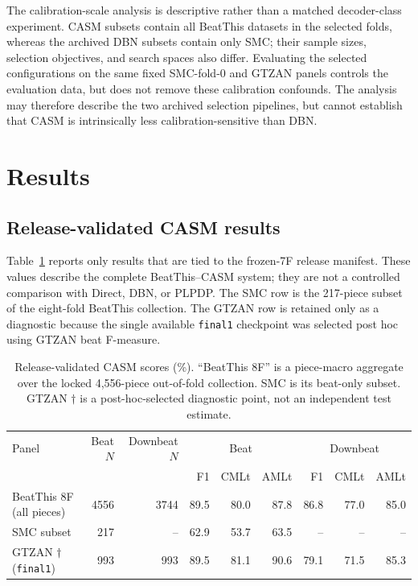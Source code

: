 \documentclass{article}
\begin{document}
The calibration-scale analysis is descriptive rather than a matched decoder-class experiment. CASM subsets contain all BeatThis datasets in the selected folds, whereas the archived DBN subsets contain only SMC; their sample sizes, selection objectives, and search spaces also differ. Evaluating the selected configurations on the same fixed SMC-fold-0 and GTZAN panels controls the evaluation data, but does not remove these calibration confounds. The analysis may therefore describe the two archived selection pipelines, but cannot establish that CASM is intrinsically less calibration-sensitive than DBN.


\section{Results}
\label{sec:results}

\subsection{Release-validated CASM results}
Table~\ref{tab:validated-release-results} reports only results that are tied to the frozen-7F release manifest. These values describe the complete BeatThis--CASM system; they are not a controlled comparison with Direct, DBN, or PLPDP. The SMC row is the 217-piece subset of the eight-fold BeatThis collection. The GTZAN row is retained only as a diagnostic because the single available \texttt{final1} checkpoint was selected post hoc using GTZAN beat F-measure.

\begin{table}[t]
\centering
\caption{Release-validated CASM scores (\%). ``BeatThis 8F'' is a piece-macro aggregate over the locked 4,556-piece out-of-fold collection. SMC is its beat-only subset. GTZAN $\dagger$ is a post-hoc-selected diagnostic point, not an independent test estimate.}
\label{tab:validated-release-results}
\begingroup
\fontsize{8.5pt}{9.5pt}\selectfont
\setlength{\tabcolsep}{4.2pt}
\begin{tabular}{lrr|rrr|rrr}
\toprule
Panel & Beat $N$ & Downbeat $N$ & \multicolumn{3}{c|}{Beat} & \multicolumn{3}{c}{Downbeat}\\
& & & F1 & CMLt & AMLt & F1 & CMLt & AMLt\\
\midrule
BeatThis 8F (all pieces) & 4556 & 3744 & 89.5 & 80.0 & 87.8 & 86.8 & 77.0 & 85.0\\
SMC subset & 217 & -- & 62.9 & 53.7 & 63.5 & -- & -- & --\\
GTZAN $\dagger$ (\texttt{final1}) & 993 & 993 & 89.5 & 81.1 & 90.6 & 79.1 & 71.5 & 85.3\\
\bottomrule
\end{tabular}
\endgroup
\end{table}
\end{document}
